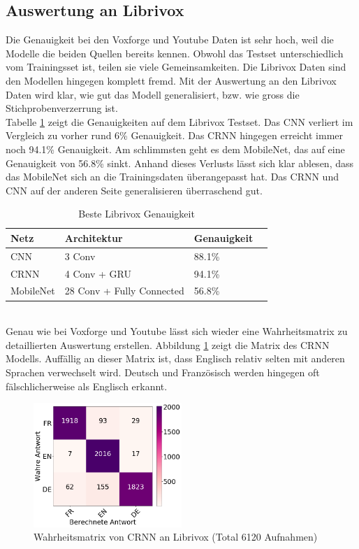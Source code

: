 \subsection{Auswertung an Librivox}
Die Genauigkeit bei den Voxforge und Youtube Daten ist sehr hoch, weil die Modelle die beiden Quellen bereits kennen. Obwohl das Testset unterschiedlich vom Trainingsset ist,  teilen sie viele Gemeinsamkeiten. Die Librivox Daten sind den Modellen hingegen komplett fremd. Mit der Auswertung an den Librivox Daten wird klar, wie gut das Modell generalisiert, bzw. wie gross die Stichprobenverzerrung ist.
\\
Tabelle \ref{table:test_lib} zeigt die Genauigkeiten auf dem Librivox Testset. Das CNN verliert im Vergleich zu vorher rund 6\% Genauigkeit. Das CRNN hingegen erreicht immer noch 94.1\% Genauigkeit. Am schlimmsten geht es dem MobileNet, das auf eine Genauigkeit von 56.8\% sinkt. Anhand dieses Verlusts lässt sich klar ablesen, dass das MobileNet sich an die Trainingsdaten überangepasst hat. Das CRNN und CNN auf der anderen Seite generalisieren überraschend gut.
\begin{table}[h]
	\centering
	\begin{tabular}{llll}
		\hline
		Netz & Architektur     & Genauigkeit  \\ \hline
		CNN  & 3 Conv          & 88.1\%       \\
		CRNN & 4 Conv + GRU   & 94.1\%       \\
		MobileNet  & 28 Conv + Fully Connected & 56.8\%       \\ \hline
	\end{tabular}
	\caption{Beste Librivox Genauigkeit}
	\label{table:test_lib}
\end{table}
\\
Genau wie bei Voxforge und Youtube lässt sich wieder eine Wahrheitsmatrix zu detaillierten Auswertung erstellen. Abbildung \ref{img:matrix_lib} zeigt die Matrix des CRNN Modells. Auffällig an dieser Matrix ist, dass Englisch relativ selten mit anderen Sprachen verwechselt wird. Deutsch und Französisch werden hingegen oft fälschlicherweise als Englisch erkannt. 
\begin{figure}[hbt]
	\centering
		\includegraphics[width=0.5\textwidth]{assets/matrix_lib_crnn.png}
	\caption{Wahrheitsmatrix von CRNN an Librivox (Total 6120 Aufnahmen)}
	\label{img:matrix_lib}
\end{figure}
